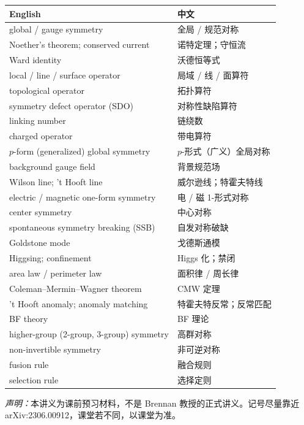 \documentclass[11pt,a4paper]{article}
\theoremstyle{definition}
\theoremstyle{plain}
\theoremstyle{remark}
\begin{document}
\begin{center}
\begin{tabular}{>{\raggedright\arraybackslash}p{} p{}}
\toprule
\textbf{English} & \textbf{中文} \\
\midrule
global / gauge symmetry & 全局 / 规范对称 \\
Noether's theorem; conserved current & 诺特定理；守恒流 \\
Ward identity & 沃德恒等式 \\
local / line / surface operator & 局域 / 线 / 面算符 \\
topological operator & 拓扑算符 \\
symmetry defect operator (SDO) & 对称性缺陷算符 \\
linking number & 链绕数 \\
charged operator & 带电算符 \\
$p$-form (generalized) global symmetry & $p$-形式（广义）全局对称 \\
background gauge field & 背景规范场 \\
Wilson line; 't Hooft line & 威尔逊线；特霍夫特线 \\
electric / magnetic one-form symmetry & 电 / 磁 1-形式对称 \\
center symmetry & 中心对称 \\
spontaneous symmetry breaking (SSB) & 自发对称破缺 \\
Goldstone mode & 戈德斯通模 \\
Higgsing; confinement & Higgs 化；禁闭 \\
area law / perimeter law & 面积律 / 周长律 \\
Coleman--Mermin--Wagner theorem & CMW 定理 \\
't Hooft anomaly; anomaly matching & 特霍夫特反常；反常匹配 \\
BF theory & BF 理论 \\
higher-group (2-group, 3-group) symmetry & 高群对称 \\
non-invertible symmetry & 非可逆对称 \\
fusion rule & 融合规则 \\
selection rule & 选择定则 \\
\bottomrule
\end{tabular}
\end{center}

\vspace{1.2em}
\noindent\textit{声明：}本讲义为课前预习材料，不是 Brennan 教授的正式讲义。记号尽量靠近 arXiv:2306.00912，课堂若不同，以课堂为准。
\end{document}
